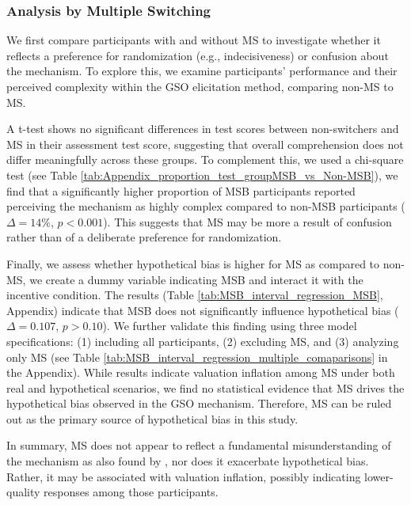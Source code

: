 \documentclass[12pt]{article}
\begin{document}
\subsubsection{Analysis by Multiple Switching}
We first compare participants with and without MS to investigate whether it reflects a preference for randomization (e.g., indecisiveness) or confusion about the mechanism. To explore this, we examine participants' performance and their perceived complexity within the GSO elicitation method, comparing non-MS to MS.

A t-test shows no significant differences in test scores between non-switchers and MS in their assessment test score, suggesting that overall comprehension does not differ meaningfully across these groups. To complement this, we used a chi-square test (see Table \ref{tab:Appendix_proportion_test_groupMSB_vs_Non-MSB}), we find that a significantly higher proportion of MSB participants reported perceiving the mechanism as highly complex compared to non-MSB participants (\(\Delta = 14\%\), \(p < 0.001\)). This suggests that MS may be more a result of confusion rather than of a deliberate preference for randomization.


Finally, we assess whether hypothetical bias is higher for MS as compared to non-MS, we create a dummy variable indicating MSB and interact it with the incentive condition. The results (Table \ref{tab:MSB_interval_regression_MSB}, Appendix) indicate that MSB does not significantly influence hypothetical bias (\(\Delta = 0.107\), \(p > 0.10\)). We further validate this finding using three model specifications: (1) including all participants, (2) excluding MS, and (3) analyzing only MS (see Table \ref{tab:MSB_interval_regression_multiple_comaparisons} in the Appendix). While results indicate valuation inflation among MS under both real and hypothetical scenarios, we find no statistical evidence that MS drives the hypothetical bias observed in the GSO mechanism. Therefore, MS can be ruled out as the primary source of hypothetical bias in this study.

In summary, MS does not appear to reflect a fundamental misunderstanding of the mechanism as also found by \citet{yu2021multiple}, nor does it exacerbate hypothetical bias. Rather, it may be associated with valuation inflation, possibly indicating lower-quality responses among those participants.
\end{document}
